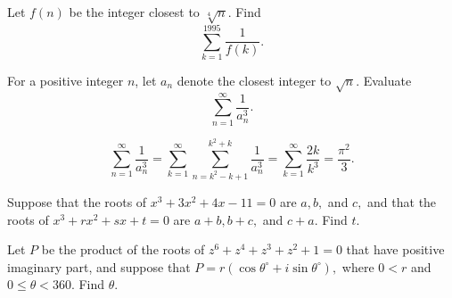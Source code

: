 \begin{question}[name={1995 AIME, \href{https://artofproblemsolving.com/community/c4p394531}{Problem 13}}]
	Let $f(n)$ be the integer closest to $\sqrt[4]{n}.$ Find $$\sum_{k=1}^{1995}\frac 1{f(k)}.$$
\end{question}


%	












\begin{question}[name={1994 Turkey, Second Round, \href{https://artofproblemsolving.com/community/c4p638049}{Problem 1}}]
	For a positive integer $n$, let $a_{n}$ denote the closest integer to $\sqrt{n}$. Evaluate\[\sum_{n=1}^\infty{\frac{1}{a_{n}^{3}}}.\]
\end{question}


\begin{solution}[name={Solution by Rust and Deedlit}]
	$$\sum_{n=1}^\infty{\frac{1}{a_{n}^{3}}}=\sum_{k=1}^{\infty }\sum_{n=k^{2}-k+1}^{k^{2}+k}\frac{1}{a_{n}^{3}}=\sum_{k=1}^{\infty}\frac{2k}{k^{3}}=\frac{\pi^{2}}{3}.$$	
\end{solution}













\begin{question}[name={1996 AIME, \href{https://artofproblemsolving.com/community/c4p394233}{Problem 5}}]
	Suppose that the roots of $x^3+3x^2+4x-11=0$ are $a, b,$ and $c,$ and that the roots of $x^3+rx^2+sx+t=0$ are $a+b, b+c,$ and $c+a.$ Find $t.$	
	
\end{question}


%	












\begin{question}[name={1996 AIME, \href{https://artofproblemsolving.com/community/c4p394249}{Problem 11}}]
	Let $P$ be the product of the roots of $z^6+z^4+z^3+z^2+1=0$ that have positive imaginary part, and suppose that $P=r(\cos \theta^\circ+i\sin \theta^\circ),$ where $0<r$ and $0\le \theta <360.$ Find $\theta.$	
\end{question}


